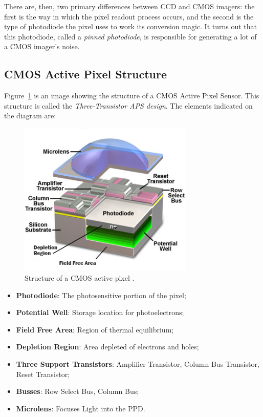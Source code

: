 \documentclass[10pt]{article}
\begin{document}
There are, then, two primary differences between CCD and CMOS imagers: the first is the way in which the pixel readout process occurs, and the second is the type of photodiode the pixel uses to work its conversion magic. It turns out that this photodiode, called a \emph{pinned photodiode}, is responsible for generating a lot of a CMOS imager's noise.

\subsection{CMOS Active Pixel Structure}

Figure~\ref{fig:ActiveStructure} is an image showing the structure of a CMOS Active Pixel Sensor. This structure is called the \emph{Three-Transistor APS design}. The elements indicated on the diagram are: 

 \begin{figure}[!t]
    \centering
        \includegraphics[height=2.9in]{Active Pixel Structure.png}
    \caption{Structure of a CMOS active pixel \cite{website:turchetta24}.}
    \label{fig:ActiveStructure}
\end{figure} 

\begin{itemize}[noitemsep]
    \item \textbf{Photodiode}: The photosensitive portion of the pixel;
    \item \textbf{Potential Well}: Storage location for photoelectrons;
    \item \textbf{Field Free Area}: Region of thermal equilibrium;
    \item \textbf{Depletion Region}: Area depleted of electrons and holes;
    \item \textbf{Three Support Transistors}: Amplifier Transistor, Column Bus Transistor, Reset Transistor; 
    \item \textbf{Busses}: Row Select Bus, Column Bus;
    \item \textbf{Microlens}: Focuses Light into the PPD.
\end{itemize}
\end{document}
